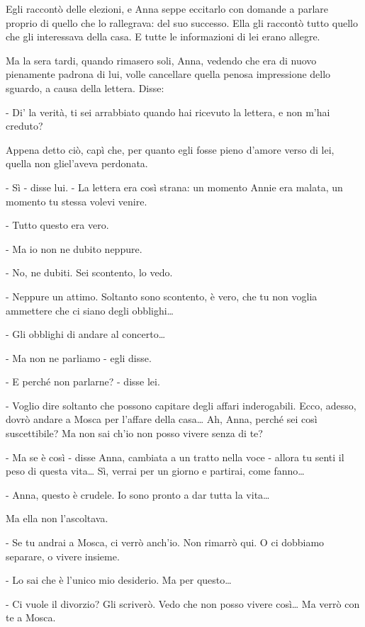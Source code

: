 Egli raccontò delle elezioni, e Anna seppe eccitarlo con domande a parlare proprio di quello che lo rallegrava: del suo successo. Ella gli raccontò tutto quello che gli interessava della casa. E tutte le informazioni di lei erano allegre. 

Ma la sera tardi, quando rimasero soli, Anna, vedendo che era di nuovo pienamente padrona di lui, volle cancellare quella penosa impressione dello sguardo, a causa della lettera. Disse: 

- Di' la verità, ti sei arrabbiato quando hai ricevuto la lettera, e non m'hai creduto? 

Appena detto ciò, capì che, per quanto egli fosse pieno d'amore verso di lei, quella non gliel'aveva perdonata. 

- Sì - disse lui. - La lettera era così strana: un momento Annie era malata, un momento tu stessa volevi venire. 

- Tutto questo era vero. 

- Ma io non ne dubito neppure. 

- No, ne dubiti. Sei scontento, lo vedo. 

- Neppure un attimo. Soltanto sono scontento, è vero, che tu non voglia ammettere che ci siano degli obblighi\ldots{} 

- Gli obblighi di andare al concerto\ldots{} 

- Ma non ne parliamo - egli disse. 

- E perché non parlarne? - disse lei. 

- Voglio dire soltanto che possono capitare degli affari inderogabili. Ecco, adesso, dovrò andare a Mosca per l'affare della casa\ldots{} Ah, Anna, perché sei così suscettibile? Ma non sai ch'io non posso vivere senza di te? 

- Ma se è così - disse Anna, cambiata a un tratto nella voce - allora tu senti il peso di questa vita\ldots{} Sì, verrai per un giorno e partirai, come fanno\ldots{} 

- Anna, questo è crudele. Io sono pronto a dar tutta la vita\ldots{} 

Ma ella non l'ascoltava. 

- Se tu andrai a Mosca, ci verrò anch'io. Non rimarrò qui. O ci dobbiamo separare, o vivere insieme. 

- Lo sai che è l'unico mio desiderio. Ma per questo\ldots{} 

- Ci vuole il divorzio? Gli scriverò. Vedo che non posso vivere così\ldots{} Ma verrò con te a Mosca. 

